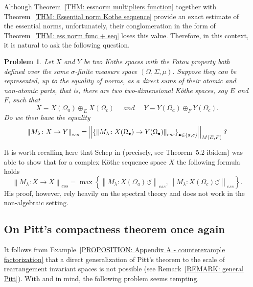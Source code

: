 \documentclass[11pt]{amsart}
\theoremstyle{definition}
\theoremstyle{definition}
\theoremstyle{definition}
\theoremstyle{definition}
\theoremstyle{definition}
\theoremstyle{definition}
\theoremstyle{definition}
\theoremstyle{definition}
\numberwithin{equation}{section}
\numberwithin{equation}{section}
\numberwithin{equation}{section}
\theoremstyle{definition}
\theoremstyle{definition}
\theoremstyle{definition}
\theoremstyle{definition}
\theoremstyle{definition}
\theoremstyle{definition}
\newtheorem{problem}[theorem]{Problem}
\newcommand{\norm}[1]{\left\lVert#1\right\rVert}
\begin{document}
Although Theorem~\ref{THM: essnorm multipliers function} together with Theorem~\ref{THM: Essential norm Kothe sequence} provide an exact estimate of the essential norms,
unfortunately, their conglomeration in the form of Theorem~\ref{THM: ess norm func + seq} loses this value. Therefore, in this context, it is natural to ask the following question.

\begin{problem}
	{\it Let $X$ and $Y$ be two K{\" o}the spaces with the Fatou property both defined over the same $\sigma$-finite measure space $(\Omega,\Sigma,\mu)$.
		Suppose they can be represented, up to the equality of norms, as a direct sums of their atomic and non-atomic parts, that is, there are two two-dimensional
		K{\" o}the spaces, say $E$ and $F$, such that}
	\begin{equation*}
		X \equiv X(\Omega_a) \oplus_E X(\Omega_c) \quad \textit{ and } \quad Y \equiv Y(\Omega_a) \oplus_F Y(\Omega_c).
	\end{equation*}
	{\it Do we then have the equality}
	\begin{equation*}
		\norm{M_{\lambda} \colon X \rightarrow Y}_{ess}
		= \norm{ \left\{ \norm{M_{\lambda} \colon X(\Omega_{\bullet}) \rightarrow Y(\Omega_{\bullet})}_{ess} \right\}_{\bullet \in \{a, c\}} }_{M(E,F)} \text{\it ?}
	\end{equation*}
\end{problem}

It is worth recalling here that Schep in \cite{Sch22} (precisely, see Theorem~5.2 ibidem) was able to show that
for a complex K{\" o}the sequence space $X$ the following formula holds
\begin{equation*}
	\norm{M_{\lambda} \colon X \rightarrow X}_{ess}
		= \max \left\{ \norm{M_{\lambda} \colon X(\Omega_a) \circlearrowleft }_{ess}, \norm{M_{\lambda} \colon X(\Omega_c) \circlearrowleft }_{ess} \right\}.
\end{equation*}
His proof, however, rely heavily on the spectral theory and does not work in the non-algebraic setting.

\subsection{On Pitt's compactness theorem once again}

It follows from Example~\ref{PROPOSITION: Appendix A - counterexample factorization} that a direct generalization of Pitt's theorem
to the scale of rearrangement invariant spaces is not possible (see Remark~\ref{REMARK: general Pitt}).
With \cite{DLMR00} and \cite{LM02} in mind, the following problem seems tempting.
\end{document}
